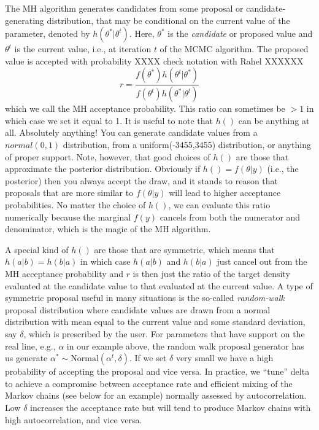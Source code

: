 The MH algorithm generates candidates from some
proposal or candidate-generating distribution, that may be conditional
on the current value of the parameter, denoted by
$h(\theta^{*}|\theta^{t})$. Here, $\theta^{*}$ is the {\it candidate}
or proposed 
value and $\theta^{t}$ is the current value, i.e., at iteration $t$ of
the MCMC algorithm.  The proposed value
is accepted with probability
XXXX check notation with Rahel XXXXXX
\[
r = \frac{ f(\theta^{*}) h(\theta^{t}|\theta^{*})}
    {f(\theta^{t}) h(\theta^{*}|\theta^{t}) }
\]
which we call the MH acceptance probability. 
This ratio can sometimes be $>1$ in which case we set it equal to
1. It is useful to note that $h()$ can be anything at all. Absolutely
anything!  You can generate candidate values from a $normal(0,1)$
distribution, from a uniform(-3455,3455) distribution, or anything of
proper support.  Note, however, that good choices of $h()$ are those
that approximate the posterior distribution. Obviously if $h() =
f(\theta|y)$ (i.e., the posterior) then you always accept the draw,
and it stands to reason that proposals that are more similar to
$f(\theta|y)$ will lead to higher acceptance probabilities. No matter
the choice of $h()$, we can evaluate this ratio numerically because
the marginal $f(y)$ cancels from both the numerator and
denominator, which is the magic of the MH algorithm.


A special kind of $h()$ are those that are symmetric, which means that
$h(a|b) = h(b|a)$ in which case $h(a|b)$ and $h(b|a)$ just cancel
out from the MH acceptance probability and $r$ is then just the ratio
of the target density evaluated at the candidate value to that
evaluated at the current value. 
A type of symmetric proposal useful in many situations is the
so-called {\it random-walk} proposal distribution where candidate values
are drawn from a normal distribution with mean equal to the current
value and some standard deviation, say $\delta$, which is prescribed by
the user. For parameters that have support on the real line, e.g., $\alpha$
in our example above, the random walk proposal generator has us
generate $\alpha^{*} \sim \mbox{Normal}(\alpha^{t},\delta)$.  If we set $\delta$
very small we have a high probability of accepting the proposal and
vice versa.  In practice, we ``tune'' delta to achieve a compromise
between acceptance rate and efficient mixing of the Markov chains (see below for an
example) normally assessed by autocorrelation. Low $\delta$ increases
the acceptance rate but will tend to produce Markov chains with high
autocorrelation, and vice versa. 

